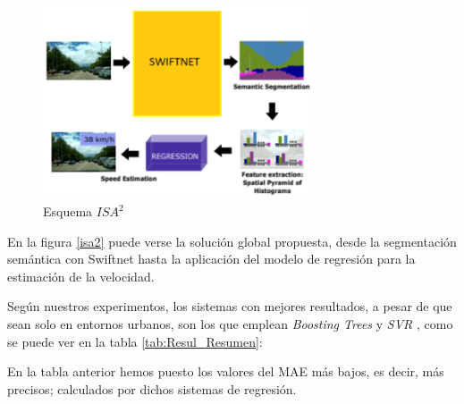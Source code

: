 \begin{figure}[H]
  \centering
  \includegraphics[width=8cm]{Figuras/Figura_Esquema_ISA2_Version_2.eps}
  \caption{Esquema $ISA^{2}$}
  \label{fig:isa2}
\end{figure}

En la figura \ref{isa2} puede verse la solución global propuesta, desde la segmentación semántica con Swiftnet hasta la aplicación del modelo de regresión para la estimación de la velocidad.


Según nuestros experimentos, los sistemas con mejores resultados, a pesar de que sean solo en entornos urbanos, son los que emplean \textit{Boosting Trees} \cite{boosting-trees} y \textit{\ac{SVR}} \cite{SVR}, como se puede ver en la tabla \ref{tab:Resul_Resumen}:

\begin{table}[H]
\centering
{}
\caption{Resultados de Boosting Trees y \ac{SVR}}
\label{tab:Resul_Resumen}
\end{table}

En la tabla anterior hemos puesto los valores del \ac{MAE} más bajos, es decir, más precisos; calculados por dichos sistemas de regresión.

